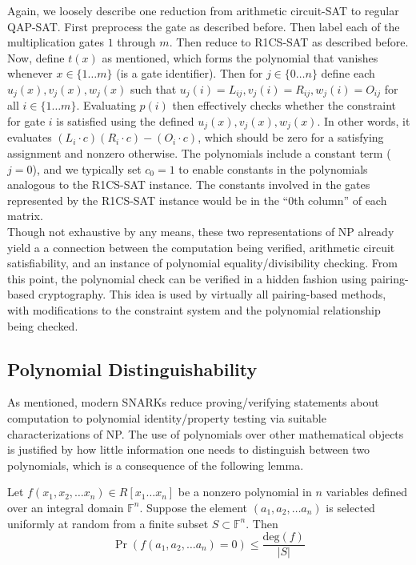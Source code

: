 \noindent Again, we loosely describe one reduction from arithmetic circuit-SAT to regular QAP-SAT. First preprocess the gate as described before. Then label each of the multiplication gates $1$ through $m$. Then reduce to R1CS-SAT as described before. Now, define $t(x)$ as mentioned, which forms the polynomial that vanishes whenever $x \in \{1 \dots m\}$ (is a gate identifier). Then for $j \in \{0 \dots n\}$ define each $u_j(x), v_j(x), w_j(x)$ such that $u_j(i) = L_{ij}, v_j(i) = R_{ij}, w_j(i) = O_{ij}$ for all $i \in \{1 \dots m\}$. Evaluating $p(i)$ then effectively checks whether the constraint for gate $i$ is satisfied using the defined $u_j(x), v_j(x), w_j(x)$. In other words, it evaluates $(L_i \cdot c) (R_i \cdot c) - (O_i \cdot c)$, which should be zero for a satisfying assignment and nonzero otherwise. The polynomials include a constant term ($j = 0$), and we typically set $c_0 = 1$ to enable constants in the polynomials analogous to the R1CS-SAT instance. The constants involved in the gates represented by the R1CS-SAT instance would be in the ``0th column'' of each matrix.\\

\noindent Though not exhaustive by any means, these two representations of NP already yield a a connection between the computation being verified, arithmetic circuit satisfiability, and an instance of polynomial equality/divisibility checking. From this point, the polynomial check can be verified in a hidden fashion using pairing-based cryptography. This idea is used by virtually all pairing-based methods, with modifications to the constraint system and the polynomial relationship being checked.

\subsection{Polynomial Distinguishability}
\noindent As mentioned, modern SNARKs reduce proving/verifying statements about computation to polynomial identity/property testing via suitable characterizations of NP. The use of polynomials over other mathematical objects is justified by how little information one needs to distinguish between two polynomials, which is a consequence of the following lemma.

\begin{lemma}
\noindent Let $f(x_1, x_2, \dots x_n) \in R[x_1 \dots x_n]$ be a nonzero polynomial in $n$ variables defined over an integral domain $\mathbb{F}^{n}$. Suppose the element $(a_1, a_2, \dots a_n)$ is selected uniformly at random from a finite subset $S \subset \mathbb{F}^n$. Then 
$$
    \Pr(f(a_1, a_2, \dots a_n) = 0) \le \frac{\text{deg}(f)}{|S|}
$$
\end{lemma}

